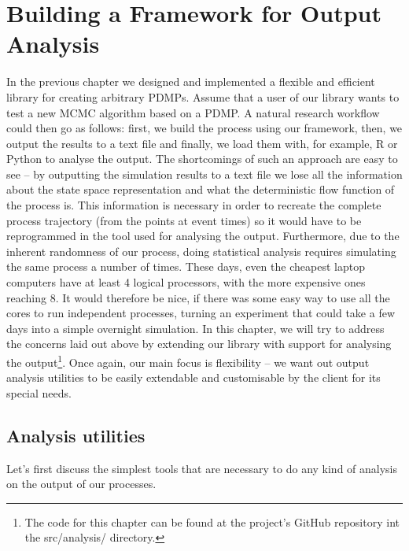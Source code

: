 \documentclass[report.tex]{subfiles}
\begin{document}
\chapter{Building a Framework for Output Analysis}
\label{output-analysis-framework}

In the previous chapter we designed and implemented a flexible and efficient
library for creating arbitrary PDMPs.
Assume that a user of our library wants to test a new MCMC algorithm based on
a PDMP.
A natural research workflow could then go as follows: first, we build the process
using our framework, then, we output the results to a text file and finally, we load
them with, for example, R or Python to analyse the output.
The shortcomings of such an approach are easy to see --
by outputting the simulation results to a text file we lose all the information
about the state space representation and what the deterministic flow function of the
process is.
This information is necessary in order to recreate the complete process trajectory (from the points at event times)
so it would have to be reprogrammed in the tool used for analysing the output.
Furthermore, due to the inherent randomness of our process, doing statistical
analysis requires simulating the same process a number of times.
These days, even the cheapest laptop computers have at least 4 logical processors, with the more
expensive ones reaching 8.
It would therefore be nice, if there was some easy way to use all the cores to run
independent processes, turning an experiment that could take a few days into a
simple overnight simulation.
In this chapter, we will try to address the concerns laid out above by extending
our library with support for analysing the
output\footnote{The code for this chapter can be found at the project's GitHub
repository int the src/analysis/ directory.}.
Once again, our main focus is flexibility -- we want out output analysis utilities
to be easily extendable and customisable by the client for its special needs.

\section{Analysis utilities}
Let's first discuss the simplest tools that are necessary to do any kind of analysis
on the output of our processes.
\end{document}
